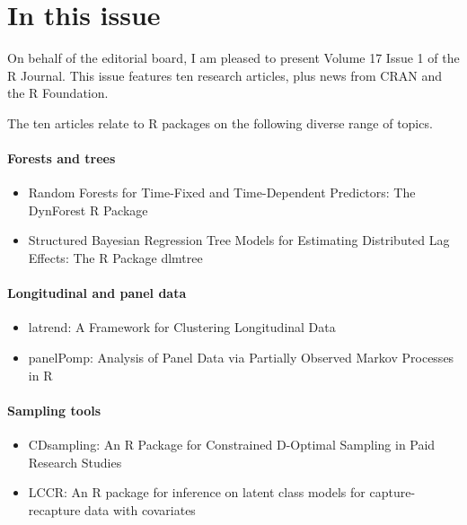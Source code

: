 \section*{In this issue}\label{in-this-issue}

On behalf of the editorial board, I am pleased to present Volume 17 Issue 1 of the R Journal. This issue features ten research articles, plus news from CRAN and the R Foundation.

The ten articles relate to R packages on the following diverse range of topics.

\paragraph{Forests and trees}\label{forests-and-trees}

\begin{itemize}
\tightlist
\item
  Random Forests for Time-Fixed and Time-Dependent Predictors: The DynForest R Package
\item
  Structured Bayesian Regression Tree Models for Estimating Distributed Lag Effects: The R Package dlmtree
\end{itemize}

\paragraph{Longitudinal and panel data}\label{longitudinal-and-panel-data}

\begin{itemize}
\tightlist
\item
  latrend: A Framework for Clustering Longitudinal Data
\item
  panelPomp: Analysis of Panel Data via Partially Observed Markov Processes in R
\end{itemize}

\paragraph{Sampling tools}\label{sampling-tools}

\begin{itemize}
\tightlist
\item
  CDsampling: An R Package for Constrained D-Optimal Sampling in Paid Research Studies
\item
  LCCR: An R package for inference on latent class models for capture-recapture data with covariates
\end{itemize}

